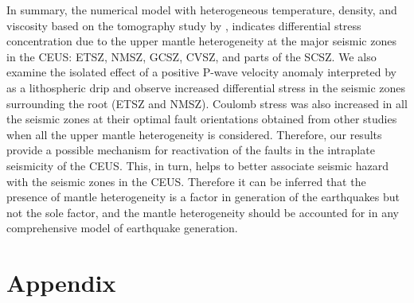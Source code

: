\documentclass[draft,linenumbers]{agujournal2018}
\begin{document}
In summary, the numerical model with heterogeneous temperature, density, and viscosity based on the tomography study by \citet{Biryol_2016}, indicates differential stress concentration due to the upper mantle heterogeneity at the major seismic zones in the CEUS: ETSZ, NMSZ, GCSZ, CVSZ, and parts of the SCSZ. We also examine the isolated effect of a positive P-wave velocity anomaly interpreted by \citet{Biryol_2016} as a lithospheric drip and observe increased differential stress in the seismic zones surrounding the root (ETSZ and NMSZ). Coulomb stress was also increased in all the seismic zones at their optimal fault orientations obtained from other studies when all the upper mantle heterogeneity is considered. Therefore, our results provide a possible mechanism for reactivation of the faults in the intraplate seismicity of the CEUS. This, in turn, helps to better associate seismic hazard with the seismic zones in the CEUS. Therefore it can be inferred that the presence of mantle heterogeneity is a factor in generation of the earthquakes but not the sole factor, and the mantle heterogeneity should be accounted for in any comprehensive model of earthquake generation.

    
\appendix
\section{Appendix}
\end{document}
